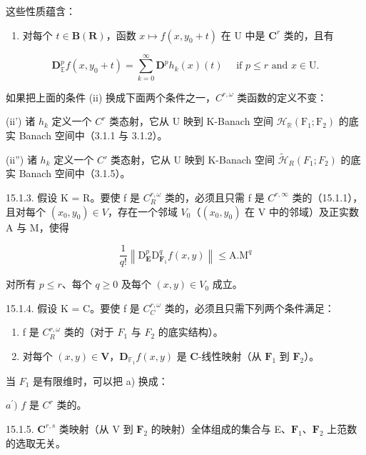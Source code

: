 这些性质蕴含：

\begin{enumerate}
\def\labelenumi{(\roman{enumi})}
\setcounter{enumi}{3}
\tightlist
\item
  对每个 \(t \in \mathbf{B}(\mathbf{R})\)，函数 \(x \mapsto f(x, y_0 + t)\) 在 U 中是 \(\mathbf{C}^{r}\) 类的，且有
\end{enumerate}

\[
\mathbf {D} _ {\mathbb {E}} ^ {p} f (x, y _ {0} + t) = \sum_ {k = 0} ^ {\infty} \mathbf {D} ^ {p} h _ {k} (x) (t) \quad \text { if } p \leqslant r \text { and } x \in \mathrm{U}.\tag{2}
\]

如果把上面的条件 (ii) 换成下面两个条件之一，\(C^{r,\omega}\) 类函数的定义不变：

(ii') 诸 \(h_k\) 定义一个 \(C^r\) 类态射，它从 U 映到 K-Banach 空间 \(\mathcal{H}_{\mathbb{R}}(\mathrm{F}_1; \mathrm{F}_2)\) 的底实 Banach 空间中（3.1.1 与 3.1.2）。

(ii'') 诸 \(h_k\) 定义一个 \(C'\) 类态射，它从 U 映到 K-Banach 空间 \(\tilde{\mathcal{H}}_R(F_1; F_2)\) 的底实 Banach 空间中（3.1.5）。

15.1.3. 假设 K = R。要使 f 是 \(C_{R}^{r,\omega}\) 类的，必须且只需 f 是 \(C^{r,\infty}\) 类的（15.1.1），且对每个 \((x_{0}, y_{0}) \in V\)，存在一个邻域 \(V_{0}\)（\((x_{0}, y_{0})\) 在 V 中的邻域）及正实数 A 与 M，使得

\[
\frac {1}{q !} \left\| \mathrm{D} _ {\mathbf {E}} ^ {p} \mathrm{D} _ {\mathbf {F} _ {1}} ^ {q} f (x, y) \right\| \leqslant \mathrm{A}. \mathrm{M} ^ {q}\tag{3}
\]

对所有 \(p \leqslant r\)、每个 \(q \geqslant 0\) 及每个 \((x, y) \in V_0\) 成立。

15.1.4. 假设 K = C。要使 f 是 \(C_{C}^{r,\omega}\) 类的，必须且只需下列两个条件满足：

\begin{enumerate}
\def\labelenumi{\alph{enumi})}
\item
  f 是 \(C_{R}^{r,\omega}\) 类的（对于 \(F_{1}\) 与 \(F_{2}\) 的底实结构）。
\item
  对每个 \((x, y) \in \mathbf{V}\)，\(\mathbf{D}_{\mathbb{F}_1} f(x, y)\) 是 \(\mathbf{C}\)-线性映射（从 \(\mathbf{F}_1\) 到 \(\mathbf{F}_2\)）。
\end{enumerate}

当 \(F_{1}\) 是有限维时，可以把 a) 换成：

\(\mathit{a}^{\prime})\) \(f\) 是 \(C^{r}\) 类的。

15.1.5. \(\mathbf{C}^{r,s}\) 类映射（从 V 到 \(\mathbf{F}_2\) 的映射）全体组成的集合与 E、\(\mathbf{F}_1\)、\(\mathbf{F}_2\) 上范数的选取无关。

